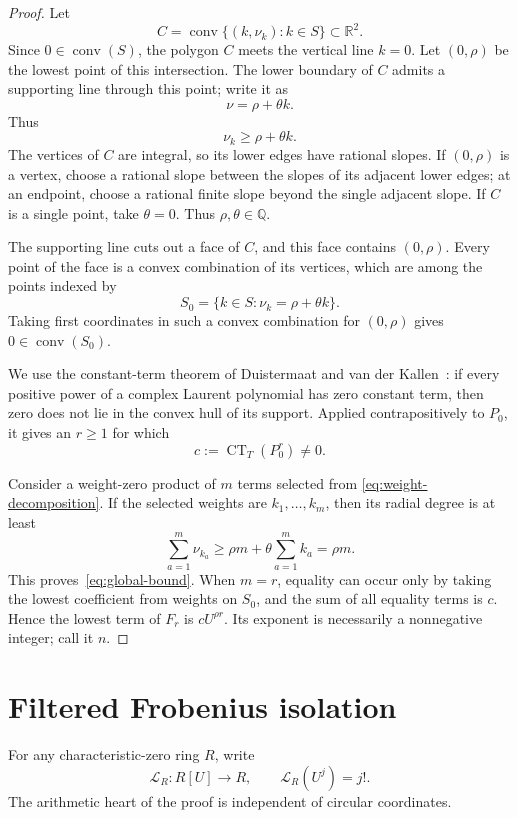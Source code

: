 \documentclass[11pt]{article}
\newcommand{\CT}{\operatorname{CT}}
\newcommand{\conv}{\operatorname{conv}}
\begin{document}
\begin{proof}
Let
\[
  C=\conv\{(k,\nu_k):k\in S\}\subset\mathbb R^2.
\]
Since \(0\in\conv(S)\), the polygon \(C\) meets the vertical line \(k=0\).
Let \((0,\rho)\) be the lowest point of this intersection.  The lower
boundary of \(C\) admits a supporting line through this point; write it as
\[
  \nu=\rho+\theta k.
\]
Thus
\[
  \nu_k\geq\rho+\theta k.
\]
The vertices of \(C\) are integral, so its lower edges have rational
slopes.  If \((0,\rho)\) is a vertex, choose a rational slope between the
slopes of its adjacent lower edges; at an endpoint, choose a rational
finite slope beyond the single adjacent slope.  If \(C\) is a single point,
take \(\theta=0\).  Thus \(\rho,\theta\in\mathbb Q\).

The supporting line cuts out a face of \(C\), and this face contains
\((0,\rho)\).  Every point of the face is a convex combination of its
vertices, which are among the points indexed by
\[
  S_0=\{k\in S:\nu_k=\rho+\theta k\}.
\]
Taking first coordinates in such a convex combination for \((0,\rho)\)
gives \(0\in\conv(S_0)\).

We use the constant-term theorem of Duistermaat and van der
Kallen~\cite[Theorem~2 and Remark~3]{DK}: if every positive power of a complex Laurent polynomial
has zero constant term, then zero does not lie in the convex hull of its
support.  Applied contrapositively to \(P_0\), it gives an \(r\geq1\) for
which
\[
  c:=\CT_T(P_0^r)\neq0.
\]

Consider a weight-zero product of \(m\) terms selected from
\eqref{eq:weight-decomposition}.  If the selected weights are
\(k_1,\ldots,k_m\), then its radial degree is at least
\[
  \sum_{a=1}^m\nu_{k_a}
  \geq \rho m+\theta\sum_{a=1}^m k_a
  =\rho m.
\]
This proves~\eqref{eq:global-bound}.  When \(m=r\), equality can occur only
by taking the lowest coefficient from weights on \(S_0\), and the sum of
all equality terms is \(c\).  Hence the lowest term of \(F_r\) is
\(cU^{\rho r}\).  Its exponent is necessarily a nonnegative integer; call
it \(n\).
\end{proof}

\section{Filtered Frobenius isolation}

For any characteristic-zero ring \(R\), write
\[
  \mathcal L_R:R[U]\longrightarrow R,\qquad
  \mathcal L_R(U^j)=j!.
\]
The arithmetic heart of the proof is independent of circular coordinates.
\end{document}
